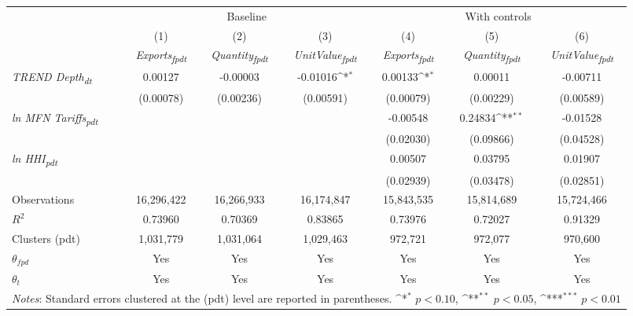 {
\def\sym#1{\ifmmode^{#1}\else\(^{#1}\)\fi}
\begin{tabular}{l*{6}{c}}
\toprule
&\multicolumn{3}{c}{Baseline}&\multicolumn{3}{c}{With controls}\\\cmidrule(lr){2-4}\cmidrule(lr){5-7}
&(1)&(2)&(3)&(4)&(5)&(6)\\
&\textit{Exports\textsubscript{fpdt}}&\textit{Quantity\textsubscript{fpdt}}&\textit{UnitValue\textsubscript{fpdt}}&\textit{Exports\textsubscript{fpdt}}&\textit{Quantity\textsubscript{fpdt}}&\textit{UnitValue\textsubscript{fpdt}}\\
\midrule
\textit{TREND Depth\textsubscript{dt}} & 0.00127 & -0.00003 & -0.01016\sym{*} & 0.00133\sym{*} & 0.00011 & -0.00711\\
 & (0.00078) & (0.00236) & (0.00591) & (0.00079) & (0.00229) & (0.00589)\\
\addlinespace
\textit{ln MFN Tariffs\textsubscript{pdt}} &  &  &  & -0.00548 & 0.24834\sym{**} & -0.01528\\
 &  &  &  & (0.02030) & (0.09866) & (0.04528)\\
\addlinespace
\textit{ln HHI\textsubscript{pdt}} &  &  &  & 0.00507 & 0.03795 & 0.01907\\
 &  &  &  & (0.02939) & (0.03478) & (0.02851)\\
\midrule
Observations & 16,296,422 & 16,266,933 & 16,174,847 & 15,843,535 & 15,814,689 & 15,724,466\\
$R^{2}$ & 0.73960 & 0.70369 & 0.83865 & 0.73976 & 0.72027 & 0.91329\\
Clusters (pdt) & 1,031,779 & 1,031,064 & 1,029,463 & 972,721 & 972,077 & 970,600\\
$\theta_{fpd}$ & Yes & Yes & Yes & Yes & Yes & Yes\\
$\theta_{t}$ & Yes & Yes & Yes & Yes & Yes & Yes\\
\bottomrule
\multicolumn{7}{l}{\footnotesize \textit{Notes}: Standard errors clustered at the (pdt) level are reported in parentheses. \sym{*} \(p<0.10\), \sym{**} \(p<0.05\), \sym{***} \(p<0.01\)}\\
\end{tabular}
}

